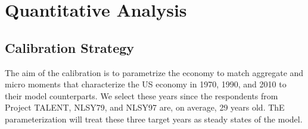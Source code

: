 \documentclass[onehalfspacing,11pt]{article}
\begin{document}
%
%
%
\section{Quantitative Analysis}\label{sec:quant}
\subsection{Calibration Strategy}\label{sec:calstrat}
The aim of the calibration is to parametrize the economy to match aggregate and micro moments that characterize the US economy in 1970, 1990, and 2010 to their model counterparts. We select these years since the respondents from Project TALENT, NLSY79, and NLSY97 are, on average, 29 years old. ThE parameterization will treat these three target years as steady states of the model.
\end{document}
